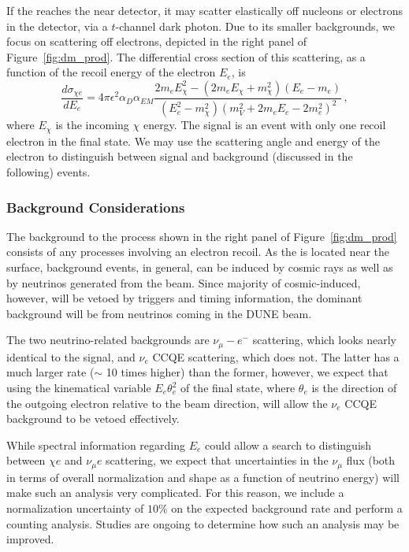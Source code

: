If the  reaches the near detector, it may scatter elastically off nucleons or electrons in the detector, via a $t$-channel dark photon. Due to its smaller backgrounds, we focus on scattering off electrons, depicted in the right panel of Figure~\ref{fig:dm_prod}. The differential cross section of this scattering, as a function of the recoil energy of the electron $E_e$, is
\begin{equation}
\frac{d\sigma_{{\chi}e}}{dE_{e}} 
= 4\pi \epsilon^{2}\alpha_D\alpha_{EM} \frac{2m_{e}E_{\chi}^{2} - (2m_{e}E_{\chi} + m_{\chi}^{2})(E_e-m_{e})}{(E_e^{2}-m_{\chi}^{2})(m_{V}^{2}+2m_{e}E_{e}-2m_{e}^{2})^{2}}\,,
\end{equation}
where $E_{\chi}$ is the incoming  $\chi$ energy. The signal is an event with only one recoil electron in the final state. We may use the scattering angle and energy of the electron to distinguish between signal and background (discussed in the following) events.

\subsubsection{Background Considerations}
 The background to the process shown in the right panel of Figure~\ref{fig:dm_prod} consists of any processes involving an electron recoil. As the  is located near the surface, background events, in general, can be induced by cosmic rays as well as by neutrinos generated from the beam. Since majority of cosmic-induced, however, will be vetoed by triggers and timing information, the dominant background will be from neutrinos coming in the DUNE beam.

The two neutrino-related backgrounds are $\nu_\mu -e^-$ scattering, which looks nearly identical to the signal, and $\nu_e$ CCQE scattering, which does not. The latter has a much larger rate ($\sim$ 10 times higher) than the former, however, we expect that using the kinematical variable $E_e \theta_e^2$ of the final state, where $\theta_e$ is the direction of the outgoing electron relative to the beam direction, will allow the $\nu_e$ CCQE background to be vetoed effectively.

While spectral information regarding $E_e$ could allow a search to distinguish between $\chi e$ and $\nu_\mu e$ scattering, we expect that uncertainties in the $\nu_\mu$ flux (both in terms of overall normalization and shape as a function of neutrino energy) will make such an analysis very complicated. For this reason, we include a normalization uncertainty of $10\%$ on the expected background rate and perform a counting analysis. Studies are ongoing to determine how such an analysis may be improved.

